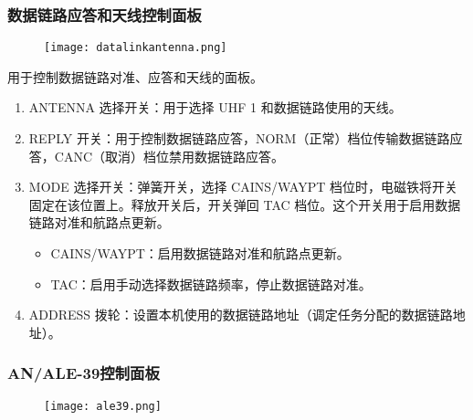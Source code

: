 \subsubsection{数据链路应答和天线控制面板}
\begin{figure}[htb]
	\centering
	\texttt{[image: datalinkantenna.png]}
\end{figure}
用于控制数据链路对准、应答和天线的面板。

\begin{enumerate}
	\item ANTENNA 选择开关：用于选择 UHF 1 和数据链路使用的天线。
	\item REPLY 开关：用于控制数据链路应答，NORM（正常）档位传输数据链路应答，CANC（取消）档位禁用数据链路应答。
	\item MODE 选择开关：弹簧开关，选择 CAINS/WAYPT 档位时，电磁铁将开关固定在该位置上。释放开关后，开关弹回 TAC 档位。这个开关用于启用数据链路对准和航路点更新。
	      \begin{itemize}
		      \item CAINS/WAYPT：启用数据链路对准和航路点更新。
		      \item TAC：启用手动选择数据链路频率，停止数据链路对准。
	      \end{itemize}
	\item ADDRESS 拨轮：设置本机使用的数据链路地址（调定任务分配的数据链路地址）。
\end{enumerate}

\subsubsection{AN/ALE-39控制面板}
\begin{figure}[htb]
	\centering
	\texttt{[image: ale39.png]}
\end{figure}

